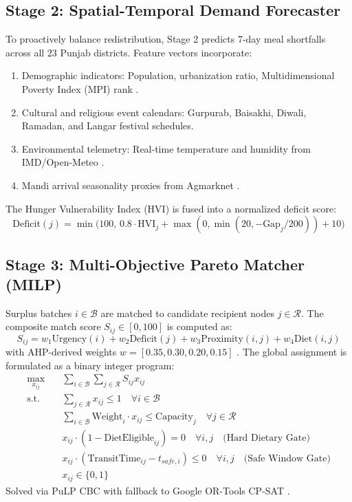 \documentclass[11pt,a4paper]{article}
\begin{document}
\subsection{Stage 2: Spatial-Temporal Demand Forecaster}
To proactively balance redistribution, Stage 2 predicts 7-day meal shortfalls across all 23 Punjab districts. Feature vectors incorporate:
\begin{enumerate}
    \item Demographic indicators: Population, urbanization ratio, Multidimensional Poverty Index (MPI) rank \cite{census2011,niti2023mpi}.
    \item Cultural and religious event calendars: Gurpurab, Baisakhi, Diwali, Ramadan, and Langar festival schedules.
    \item Environmental telemetry: Real-time temperature and humidity from IMD/Open-Meteo \cite{imd2024,openmeteo2024}.
    \item Mandi arrival seasonality proxies from Agmarknet \cite{agmarknet2024}.
\end{enumerate}
The Hunger Vulnerability Index (HVI) is fused into a normalized deficit score:
\begin{equation}
    \text{Deficit}(j) = \min\Big(100,\, 0.8 \cdot \text{HVI}_j + \max(0, \min(20, -\text{Gap}_j / 200)) + 10\Big)
\end{equation}

\subsection{Stage 3: Multi-Objective Pareto Matcher (MILP)}
Surplus batches $i \in \mathcal{B}$ are matched to candidate recipient nodes $j \in \mathcal{R}$. The composite match score $S_{ij} \in [0, 100]$ is computed as:
\begin{equation}
    S_{ij} = w_1 \text{Urgency}(i) + w_2 \text{Deficit}(j) + w_3 \text{Proximity}(i, j) + w_4 \text{Diet}(i, j)
\end{equation}
with AHP-derived weights $w = [0.35, 0.30, 0.20, 0.15]$ \cite{saaty1980ahp}. The global assignment is formulated as a binary integer program:
\begin{align}
    \max_{x_{ij}} \quad & \sum_{i \in \mathcal{B}} \sum_{j \in \mathcal{R}} S_{ij} x_{ij} \\
    \text{s.t.} \quad & \sum_{j \in \mathcal{R}} x_{ij} \le 1 \quad \forall i \in \mathcal{B} \\
    & \sum_{i \in \mathcal{B}} \text{Weight}_i \cdot x_{ij} \le \text{Capacity}_j \quad \forall j \in \mathcal{R} \\
    & x_{ij} \cdot (1 - \text{DietEligible}_{ij}) = 0 \quad \forall i, j \quad \text{(Hard Dietary Gate)} \\
    & x_{ij} \cdot (\text{TransitTime}_{ij} - t_{safe, i}) \le 0 \quad \forall i, j \quad \text{(Safe Window Gate)} \\
    & x_{ij} \in \{0, 1\}
\end{align}
Solved via PuLP CBC \cite{pulp2011} with fallback to Google OR-Tools CP-SAT \cite{orgtools2024}.
\end{document}
